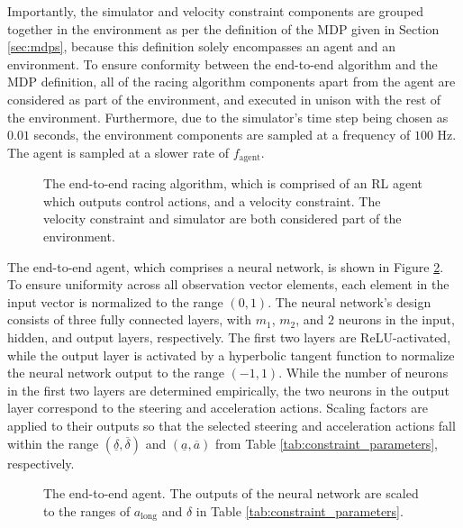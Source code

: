 Importantly, the simulator and velocity constraint components are grouped together in the environment as per the definition of the MDP given in Section \ref{sec:mdps}, because this definition solely encompasses an agent and an environment. 
To ensure conformity between the end-to-end algorithm and the MDP definition, all of the racing algorithm components apart from the agent are considered as part of the environment, and executed in unison with the rest of the environment.
Furthermore, due to the simulator's time step being chosen as $0.01$ seconds, the environment components are sampled at a frequency of $100$ Hz.
The agent is sampled at a slower rate of $f_{\text{agent}}$.


\begin{figure}[htb!]
    \centering
    
    \caption[The end-to-end driving architecture]{The end-to-end racing algorithm, which is comprised of an RL agent which outputs control actions, and a velocity constraint. The velocity constraint and simulator are both considered part of the environment.}
    \label{fig:end_to_end_architecture}
\end{figure}

The end-to-end agent, which comprises a neural network, is shown in Figure \ref{fig:actor_architecture}.
To ensure uniformity across all observation vector elements, each element in the input vector is normalized to the range $(0,1)$. 
The neural network's design consists of three fully connected layers, with $m_1$, $m_2$, and $2$ neurons in the input, hidden, and output layers, respectively. 
The first two layers are ReLU-activated, while the output layer is activated by a hyperbolic tangent function to normalize the neural network output to the range $(-1,1)$. 
While the number of neurons in the first two layers are determined empirically, the two neurons in the output layer correspond to the steering and acceleration actions. 
Scaling factors are applied to their outputs so that the selected steering and acceleration actions fall within the range $(\underline{\delta}, \overline{\delta})$ and $(\underline{a}, \overline{a})$ from Table \ref{tab:constraint_parameters}, respectively.

\begin{figure}[htb!]
    \centering
    
    \caption[The end-to-end agent]{The end-to-end agent. The outputs of the neural network are scaled to the ranges of $a_{\text{long}}$ and $\delta$ in Table \ref{tab:constraint_parameters}.}
    \label{fig:actor_architecture}
\end{figure}


